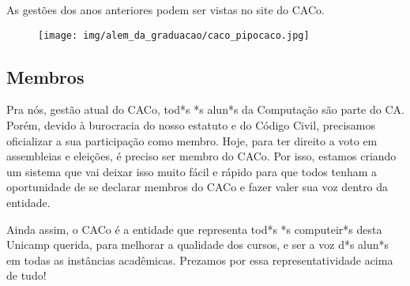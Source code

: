 As gestões dos anos anteriores podem ser vistas no site do CACo.

\begin{figure}[H]
    \centering
    \texttt{[image: img/alem\_da\_graduacao/caco\_pipocaco.jpg]}
\end{figure}

\subsection{Membros}

Pra nós, gestão atual do CACo, tod*s *s alun*s da Computação são parte do CA.
Porém, devido à burocracia do nosso estatuto e do Código Civil, precisamos
oficializar a sua participação como membro. Hoje, para ter direito a voto em
assembleias e eleições, é preciso ser membro do CACo. Por isso, estamos criando
um sistema que vai deixar isso muito fácil e rápido para que todos tenham a
oportunidade de se declarar membros do CACo e fazer valer sua voz dentro da
entidade.

Ainda assim, o CACo é a entidade que representa tod*s *s computeir*s desta
Unicamp querida, para melhorar a qualidade dos cursos, e ser a voz d*s alun*s em
todas as instâncias acadêmicas. Prezamos por essa representatividade acima de
tudo!

